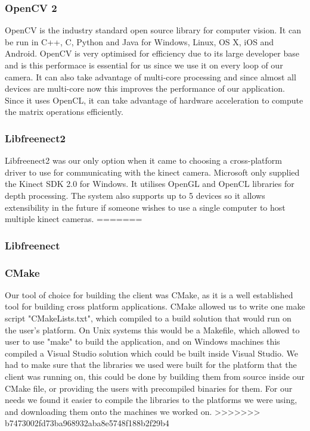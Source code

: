 \documentclass{article}
\begin{document}
\subsubsection{OpenCV 2}
OpenCV is the industry standard open source library for computer vision. It can be run in C++, C, Python and Java for Windows, Linux, OS X, iOS and Android. OpenCV is very optimised for efficiency due to its large developer base and is this performace is essential for us since we use it on every loop of our camera. It can also take advantage of multi-core processing and since almost all devices are multi-core now this improves the performance of our application. Since it uses OpenCL, it can take advantage of hardware acceleration to compute the matrix operations efficiently.
\subsubsection{Libfreenect2}
Libfreenect2 was our only option when it came to choosing a cross-platform driver to use for communicating with the kinect camera. Microsoft only supplied the Kinect SDK 2.0 for Windows. It utilises OpenGL and OpenCL libraries for depth processing. The system also supports up to 5 devices so it allows extensibility in the future if someone wishes to use a single computer to host multiple kinect cameras.
=======
\subsubsection{Libfreenect}
\subsubsection{CMake}
Our tool of choice for building the client was CMake, as it is a well established tool for building cross platform applications. CMake allowed us to write one make script "CMakeLists.txt", which compiled to a build solution that would run on the user's platform. On Unix systems this would be a Makefile, which allowed to user to use "make" to build the application, and on Windows machines this compiled a Visual Studio solution which could be built inside Visual Studio. We had to make sure that the libraries we used were built for the platform that the client was running on, this could be done by building them from source inside our CMake file, or providing the users with precompiled binaries for them. For our needs we found it easier to compile the libraries to the platforms we were using, and downloading them onto the machines we worked on. 
>>>>>>> b7473002fd73ba968932aba8e5748f188b2f29b4
\end{document}
